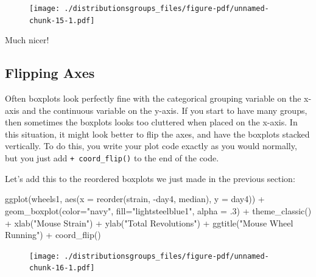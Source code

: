 \documentclass[
  letterpaper,
  DIV=11,
  numbers=noendperiod]{scrreprt}
\newenvironment{Shaded}{\begin{snugshade}}{\end{snugshade}}
\newcommand{\AttributeTok}[1]{\textcolor[rgb]{0.40,0.45,0.13}{#1}}
\newcommand{\DecValTok}[1]{\textcolor[rgb]{0.68,0.00,0.00}{#1}}
\newcommand{\FunctionTok}[1]{\textcolor[rgb]{0.28,0.35,0.67}{#1}}
\newcommand{\NormalTok}[1]{\textcolor[rgb]{0.00,0.23,0.31}{#1}}
\newcommand{\SpecialCharTok}[1]{\textcolor[rgb]{0.37,0.37,0.37}{#1}}
\newcommand{\StringTok}[1]{\textcolor[rgb]{0.13,0.47,0.30}{#1}}
\begin{document}
\begin{figure}[H]

{\centering \texttt{[image: ./distributionsgroups\_files/figure-pdf/unnamed-chunk-15-1.pdf]}

}

\end{figure}

Much nicer!

\hypertarget{flipping-axes}{%
\subsection{Flipping Axes}\label{flipping-axes}}

Often boxplots look perfectly fine with the categorical grouping
variable on the x-axis and the continuous variable on the y-axis. If you
start to have many groups, then sometimes the boxplots looks too
cluttered when placed on the x-axis. In this situation, it might look
better to flip the axes, and have the boxplots stacked vertically. To do
this, you write your plot code exactly as you would normally, but you
just add \texttt{+\ coord\_flip()} to the end of the code.

Let's add this to the reordered boxplots we just made in the previous
section:

\begin{Shaded}
\begin{Highlighting}[]
\FunctionTok{ggplot}\NormalTok{(wheels1, }\FunctionTok{aes}\NormalTok{(}\AttributeTok{x =} \FunctionTok{reorder}\NormalTok{(strain, }\SpecialCharTok{{-}}\NormalTok{day4, median), }\AttributeTok{y =}\NormalTok{ day4)) }\SpecialCharTok{+} 
  \FunctionTok{geom\_boxplot}\NormalTok{(}\AttributeTok{color=}\StringTok{"navy"}\NormalTok{, }\AttributeTok{fill=}\StringTok{"lightsteelblue1"}\NormalTok{, }\AttributeTok{alpha =}\NormalTok{ .}\DecValTok{3}\NormalTok{) }\SpecialCharTok{+}
  \FunctionTok{theme\_classic}\NormalTok{() }\SpecialCharTok{+}
  \FunctionTok{xlab}\NormalTok{(}\StringTok{"Mouse Strain"}\NormalTok{) }\SpecialCharTok{+}
  \FunctionTok{ylab}\NormalTok{(}\StringTok{"Total Revolutions"}\NormalTok{) }\SpecialCharTok{+}
  \FunctionTok{ggtitle}\NormalTok{(}\StringTok{"Mouse Wheel Running"}\NormalTok{) }\SpecialCharTok{+}
  \FunctionTok{coord\_flip}\NormalTok{()}
\end{Highlighting}
\end{Shaded}

\begin{figure}[H]

{\centering \texttt{[image: ./distributionsgroups\_files/figure-pdf/unnamed-chunk-16-1.pdf]}

}

\end{figure}
\end{document}

